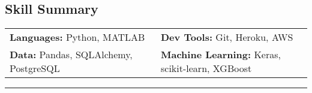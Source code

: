 \documentclass[10pt,letterpaper]{article}
\newenvironment{indentsection}[1]%
{\begin{list}{}%
	{\setlength{\leftmargin}{#1}}%
	\item[]%
}
{\end{list}}
\begin{document}
\subsection*{Skill Summary}
\begin{indentsection}{\parindent}
\begin{tabular}{p{0.5\linewidth}   p{0.5\linewidth} } 

\textbf{Languages:}  Python, MATLAB 			& \textbf{Dev Tools:}  Git, Heroku, AWS \\  
\textbf{Data:} Pandas, SQLAlchemy, PostgreSQL 	& \textbf{Machine Learning:}  Keras, scikit-learn, XGBoost  \\






\end{tabular}
\end{indentsection}


\hrule
\vspace{-0.4em}
\end{document}
